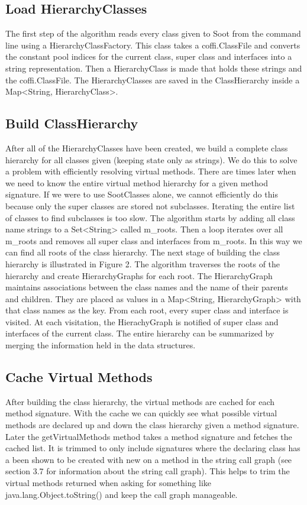 \documentclass[preprint]{sigplanconf}
\begin{document}
\subsection{Load HierarchyClasses}
The first step of the algorithm reads every class given to Soot from the command line using a HierarchyClassFactory. This class takes a coffi.ClassFile and converts the constant pool indices for the current class, super class and interfaces into a string representation. Then a HierarchyClass is made that holds these strings and the coffi.ClassFile. The HierarchyClasses are saved in the ClassHierarchy inside a Map<String, HierarchyClass>.

\subsection{Build ClassHierarchy}
After all of the HierarchyClasses have been created, we build a complete class hierarchy for all classes given (keeping state only as strings). We do this to solve a problem with efficiently resolving virtual methods. There are times later when we need to know the entire virtual method hierarchy for a given method signature. If we were to use SootClasses alone, we cannot efficiently do this because only the super classes are stored not subclasses. Iterating the entire list of classes to find subclasses is too slow.
The algorithm starts by adding all class name strings to a Set<String> called m\_roots. Then a loop iterates over all m\_roots and removes all super class and interfaces from m\_roots. In this way we can find all roots of the class hierarchy.
The next stage of building the class hierarchy is illustrated in Figure 2. The algorithm traverses the roots of the hierarchy and create HierarchyGraphs for each root. The HierarchyGraph maintains associations between the class names and the name of their parents and children. They are placed as values in a Map<String, HierarchyGraph> with that class names as the key. From each root, every super class and interface is visited. At each visitation, the HierachyGraph is notified of super class and interfaces of the current class. The entire hierarchy can be summarized by merging the information held in the data structures.

\subsection{Cache Virtual Methods}
After building the class hierarchy, the virtual methods are cached for each method signature. With the cache we can quickly see what possible virtual methods are declared up and down the class hierarchy given a method signature. Later the getVirtualMethods method takes a method signature and fetches the cached list. It is trimmed to only include signatures where the declaring class has a been shown to be created with new on a method in the string call graph (see section 3.7 for information about the string call graph). This helps to trim the virtual methods returned when asking for something like java.lang.Object.toString() and keep the call graph manageable.
\end{document}
